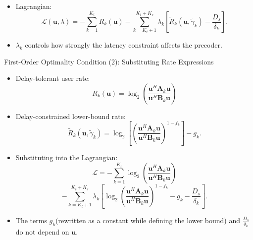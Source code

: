 \documentclass{beamer}
\begin{document}
\begin{frame}
\begin{itemize}
    \item Lagrangian:
    \[
        \mathcal{L}(\mathbf{u},\lambda)
        =
        -
        \sum_{k=1}^{K_t} R_k(\mathbf{u})
        -
        \sum_{k=K_t+1}^{K_t+K_s}
        \lambda_k
        \left[
        \tilde{R}_k(\mathbf{u},\tilde{\gamma}_k)
        -
        \frac{D_s}{\delta_k}
        \right].
    \]

    \item $\lambda_k$ controls how strongly the latency constraint affects the precoder.
\end{itemize}

\end{frame}

\begin{frame}{First-Order Optimality Condition (2): Substituting Rate Expressions}
\small

\begin{itemize}
    \item Delay-tolerant user rate:
    \[
        R_k(\mathbf{u})
        =
        \log_2
        \left(
        \frac{\mathbf{u}^H\mathbf{A}_k\mathbf{u}}
        {\mathbf{u}^H\mathbf{B}_k\mathbf{u}}
        \right)
    \]

    \item Delay-constrained lower-bound rate:
    \[
        \tilde{R}_k(\mathbf{u},\tilde{\gamma}_k)
        =
        \log_2
        \left[
        \left(
        \frac{\mathbf{u}^H\mathbf{A}_k\mathbf{u}}
        {\mathbf{u}^H\mathbf{B}_k\mathbf{u}}
        \right)^{1-f_k}
        \right]
        -
        g_k .
    \]

    \item Substituting into the Lagrangian:
    \[
        \mathcal{L}
        =
        -
        \sum_{k=1}^{K_t}
        \log_2
        \left(
        \frac{\mathbf{u}^H\mathbf{A}_k\mathbf{u}}
        {\mathbf{u}^H\mathbf{B}_k\mathbf{u}}
        \right)
    \]
    \[
        -
        \sum_{k=K_t+1}^{K_t+K_s}
        \lambda_k
        \left[
        \log_2
        \left(
        \frac{\mathbf{u}^H\mathbf{A}_k\mathbf{u}}
        {\mathbf{u}^H\mathbf{B}_k\mathbf{u}}
        \right)^{1-f_k}
        -
        g_k
        -
        \frac{D_s}{\delta_k}
        \right].
    \]

    \item The terms $g_k$(rewritten as a constant while defining the lower bound) and $\frac{D_s}{\delta_k}$ do not depend on $\mathbf{u}$.
\end{itemize}

\end{frame}
\end{document}
